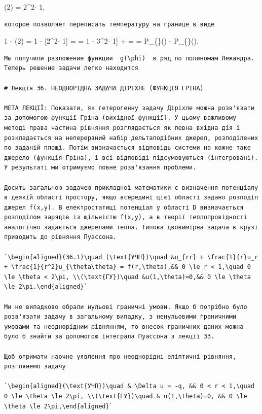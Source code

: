 \documentclass[
  ukrainian,
]{article}
\begin{document}
\cos(2\varphi) = 2\cos\^{}2\varphi - 1,

\begin{verbatim}
которое позволяет переписать температуру на границе в виде
\end{verbatim}

1 - \cos(2\varphi) = 1 - {[}2\cos\^{}2\varphi - 1{]} = = 1 -
\frac{2}{3}{[}3\cos\^{}2\varphi - 1{]} +  = =
P\_\{\theta\}(\cos\varphi) -
P\_\{\theta\}(\cos\varphi).

\begin{verbatim}
Мы получили разложение функции  g(\phi)  в ряд по полиномам Лежандра. Теперь решение задачи легко находится

# Лекція 36. НЕОДНОРІДНА ЗАДАЧА ДІРІХЛЕ (ФУНКЦІЯ ГРІНА)

МЕТА ЛЕКЦІЇ: Показати, як гетерогенну задачу Діріхле можна розв'язати за допомогою функції Гріна (вихідної функції). У цьому важливому методі права частина рівняння розглядається як певна вхідна дія і розкладається на неперервний набір дельтаподібних джерел, розподілених по заданій площі. Потім визначається відповідь системи на кожне таке джерело (функція Гріна), і всі відповіді підсумовуються (інтегровані). У результаті ми отримуємо повне розв'язання проблеми.

Досить загальною задачею прикладної математики є визначення потенціалу в деякій області простору, якщо всередині цієї області задано розподіл джерел f(x,y). В електростатиці потенціал у області D визначається розподілом зарядів із щільністю f(x,y), а в теорії теплопровідності аналогічно задається джерелами тепла. Типова двовимірна задача в крузі приводить до рівняння Пуассона.

`\begin{aligned}(36.1)\quad (\text{УЧП})\quad &u_{rr} + \frac{1}{r}u_r + \frac{1}{r^2}u_{\theta\theta} = f(r,\theta),&& 0 \le r < 1,\quad 0 \le \theta < 2\pi, \\(\text{ГУ})\quad &u(1,\theta)=0,&& 0 \le \theta \le 2\pi.\end{aligned}`

Ми не випадково обрали нульові граничні умови. Якщо б потрібно було розв'язати задачу в загальному випадку, з ненульовими граничними умовами та неоднорідним рівнянням, то внесок граничних даних можна було б знайти за допомогою інтеграла Пуассона з лекції 33.

Щоб отримати наочне уявлення про неоднорідні еліптичні рівняння, розглянемо задачу

`\begin{aligned}(\text{УЧП})\quad & \Delta u = -q, && 0 < r < 1,\quad 0 \le \theta \le 2\pi, \\(\text{ГУ})\quad & u(1,\theta)=0, && 0 \le \theta \le 2\pi,\end{aligned}`


\end{verbatim}
\end{document}
